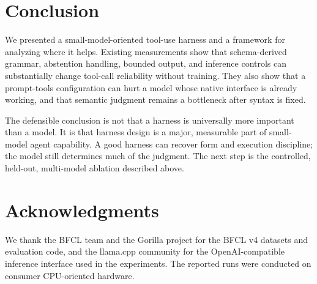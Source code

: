 \documentclass[conference]{IEEEtran}
\begin{document}
\section{Conclusion}

We presented a small-model-oriented tool-use harness and a framework for analyzing where it
helps. Existing measurements show that schema-derived grammar, abstention handling, bounded
output, and inference controls can substantially change tool-call reliability without training.
They also show that a prompt-tools configuration can hurt a model whose native interface is
already working, and that semantic judgment remains a bottleneck after syntax is fixed.

The defensible conclusion is not that a harness is universally more important than a model.
It is that harness design is a major, measurable part of small-model agent capability. A good
harness can recover form and execution discipline; the model still determines much of the
judgment. The next step is the controlled, held-out, multi-model ablation described above.

\section*{Acknowledgments}

We thank the BFCL team and the Gorilla project for the BFCL v4 datasets and evaluation code,
and the llama.cpp community for the OpenAI-compatible inference interface used in the
experiments. The reported runs were conducted on consumer CPU-oriented hardware.



\end{document}
